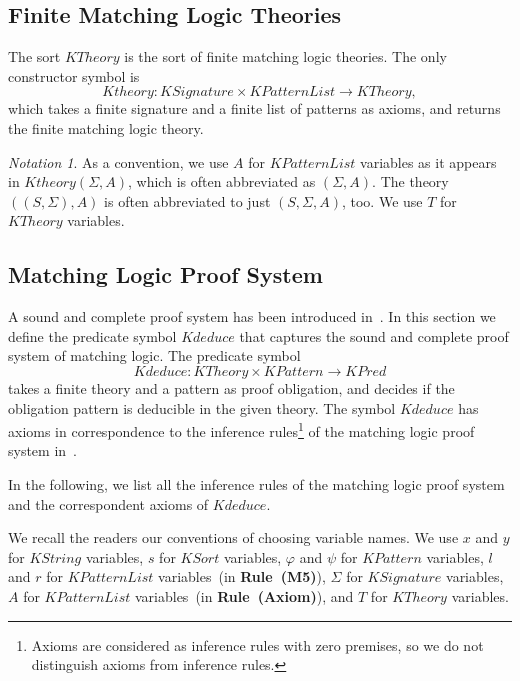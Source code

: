 \documentclass[UTF8,11pt]{article}
\newcounter{thmcounter}
\theoremstyle{plain}
\theoremstyle{definition}
\theoremstyle{remark}
\newtheorem{notation}   [thmcounter]{Notation}
\newcommand{\KPred}{\mathit{KPred}}
\newcommand{\KString}{\mathit{KString}}
\newcommand{\KSort}{\mathit{KSort}}
\newcommand{\KPatternList}{\mathit{KPatternList}}
\newcommand{\KPattern}{\mathit{KPattern}}
\newcommand{\KSignature}{\mathit{KSignature}}
\newcommand{\KTheory}{\mathit{KTheory}}
\newcommand{\Ktheory}{\mathit{Ktheory}}
\newcommand{\Kdeduce}{\mathit{Kdeduce}}
\begin{document}
\subsection{Finite Matching Logic Theories}

The sort $\KTheory$ is the sort of finite matching logic theories. The only constructor symbol is 
$$\Ktheory \colon \KSignature \times \KPatternList \to \KTheory,$$
which takes a finite signature and a finite list of patterns as axioms, and returns the finite matching logic theory. 

\begin{notation}
	As a convention, we use $A$ for $\KPatternList$ variables as it appears in $\Ktheory(\Sigma, A)$, which is often abbreviated as $( \Sigma, A )$. The theory $( ( S, \Sigma ), A )$ is often abbreviated to just $( S, \Sigma, A )$, too. We use $T$ for $\KTheory$ variables.  
\end{notation}

\subsection{Matching Logic Proof System}
\label{sec:ml-proof-system-finite-case}

A sound and complete proof system has been introduced in~\cite{rosu-2017-lmcs}.
In this section we define the predicate symbol $\Kdeduce$ that captures the sound and complete proof system of matching logic.
The predicate symbol
$$
\Kdeduce \colon \KTheory \times \KPattern \to \KPred
$$
takes a finite theory and a pattern as proof obligation, and decides if the obligation pattern is deducible in the given theory.
The symbol $\Kdeduce$ has axioms in correspondence to the inference rules\footnote{Axioms are considered as inference rules with zero premises, so we do not distinguish axioms from inference rules.} 
of the matching logic proof system in~\cite{rosu-2017-lmcs}.

In the following, we list all the inference rules of the matching logic proof system and the correspondent axioms of $\Kdeduce$. 

We recall the readers our conventions of choosing variable names. 
We use 
$x$ and $y$ for $\KString$ variables,
$s$ for $\KSort$ variables,
$\varphi$ and $\psi$ for $\KPattern$ variables,
$l$ and $r$ for $\KPatternList$ variables~(in \textbf{Rule~(M5)}),
$\Sigma$ for $\KSignature$ variables, 
$A$ for $\KPatternList$ variables~(in \textbf{Rule~(Axiom)}),
and $T$ for $\KTheory$ variables.
\end{document}
